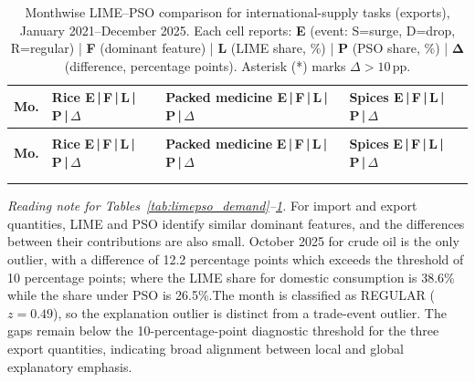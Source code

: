 \documentclass[pdftex,sn-mathphys-num]{sn-jnl}
\renewcommand{\arraystretch}{0.92}
\begin{document}
\vspace{6pt}
\begingroup
\setlength{\tabcolsep}{3pt}
\renewcommand{\arraystretch}{1.08}
\scriptsize
\begin{longtable}{%
  >{\raggedright}p{1.10cm}%
  >{\raggedright}p{4.05cm}%
  >{\raggedright}p{4.05cm}%
  >{\raggedright}p{4.05cm}%
}
\caption{Monthwise LIME--PSO comparison for international-supply tasks (exports), January 2021--December 2025.
Each cell reports: \textbf{E} (event: S=surge, D=drop, R=regular) | \textbf{F} (dominant feature) | \textbf{L} (LIME share, \%) | \textbf{P} (PSO share, \%) | $\boldsymbol{\Delta}$ (difference, percentage points). Asterisk (*) marks $\Delta>10$\,pp.}
\label{tab:limepso_supply}\\
\toprule
\textbf{Mo.} &
\parbox[c]{4.00cm}{\centering\small\textbf{Rice}\\[1pt]\textbf{E\,|\,F\,|\,L\,|\,P\,|\,$\Delta$}} &
\parbox[c]{4.00cm}{\centering\small\textbf{Packed medicine}\\[1pt]\textbf{E\,|\,F\,|\,L\,|\,P\,|\,$\Delta$}} &
\parbox[c]{4.00cm}{\centering\small\textbf{Spices}\\[1pt]\textbf{E\,|\,F\,|\,L\,|\,P\,|\,$\Delta$}}\\
\midrule
\endfirsthead
{}\\[2pt]
\toprule
\textbf{Mo.} &
\parbox[c]{4.00cm}{\centering\small\textbf{Rice}\\[1pt]\textbf{E\,|\,F\,|\,L\,|\,P\,|\,$\Delta$}} &
\parbox[c]{4.00cm}{\centering\small\textbf{Packed medicine}\\[1pt]\textbf{E\,|\,F\,|\,L\,|\,P\,|\,$\Delta$}} &
\parbox[c]{4.00cm}{\centering\small\textbf{Spices}\\[1pt]\textbf{E\,|\,F\,|\,L\,|\,P\,|\,$\Delta$}}\\
\midrule
\endhead
\midrule
{}\\
\endfoot
\bottomrule
\endlastfoot

\end{longtable}
\endgroup

\vspace{4pt}
\noindent\small\textit{Reading note for Tables~\ref{tab:limepso_demand}--\ref{tab:limepso_supply}.} For import and export quantities, LIME and PSO identify similar dominant features, and the differences between their contributions are also small. October 2025 for crude oil is the only outlier, with a difference of 12.2 percentage points which exceeds the threshold of 10 percentage points; where the LIME share for domestic consumption is 38.6\% while the share under PSO is 26.5\%.The month is classified as REGULAR ($z = 0.49$), so the explanation outlier is distinct from a trade-event outlier. The gaps remain below the 10-percentage-point diagnostic threshold for the three export quantities, indicating broad alignment between local and global explanatory emphasis.
\end{document}
